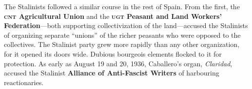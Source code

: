 The Stalinists followed a similar course in the rest of Spain. From the first, the \textbf{\textsc{cnt} Agricultural Union} and the \textbf{\textsc{ugt} Peasant and Land Workers’ Federation}---both supporting collectivization of the land---accused the Stalinists of organizing separate ``unions'' of the richer peasants who were opposed to the collectives. The Stalinist party grew more rapidly than any other organization, for it opened its doors wide. Dubious bourgeois elements flocked to it for protection. As early as August 19 and 20, 1936, Caballero’s organ, \emph{Claridad}, accused the Stalinist \textbf{Alliance of Anti-Fascist Writers} of harbouring reactionaries.

